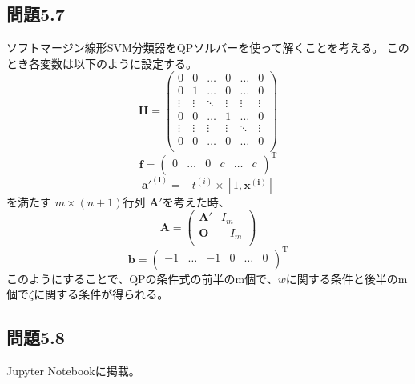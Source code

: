 \documentclass[a4j,twocolumn]{jsarticle}
\begin{document}
\subsection{問題5.7}
ソフトマージン線形SVM分類器をQPソルバーを使って解くことを考える。
このとき各変数は以下のように設定する。
\begin{equation}
\bm{H} = 
\begin{pmatrix} 
    0 & 0 & \dots  & 0 & \dots & 0 \\
    0 & 1 & \dots  & 0 & \dots & 0 \\
    \vdots & \vdots & \ddots & \vdots & \vdots & \vdots \\
    0 & 0 & \dots  & 1 & \dots & 0 \\
    \vdots & \vdots & \vdots & \vdots & \ddots & \vdots \\
    0 & 0 & \dots  & 0 & \dots & 0 \\
\end{pmatrix}
\end{equation}
\begin{equation}
\bm{f} = 
\begin{pmatrix} 
    0 &  \dots  & 0 & c & \dots & c \\
\end{pmatrix}
^\mathrm{T}
\end{equation}
\begin{equation}
    \bm{a'^{(i)}} = -t^{(i)} \times [1, \bm{x^{(i)}}]
\end{equation}
を満たす $m \times (n+1)$行列 $\bm{A'}$を考えた時、
\begin{equation}
    \bm{A} = 
\begin{pmatrix} 
    \bm{A'} &  I_{m}\\
    \bm{O} & -I_{m} \\
\end{pmatrix}
\end{equation}
\begin{equation}
    \bm{b} = 
    \begin{pmatrix} 
        -1 &  \dots  & -1 & 0 & \dots & 0 \\
    \end{pmatrix}
    ^\mathrm{T}
\end{equation}
このようにすることで、QPの条件式の前半のm個で、$w$に関する条件と後半のm個で$\zeta$に関する条件が得られる。

\subsection{問題5.8}
Jupyter Notebookに掲載。
\end{document}
